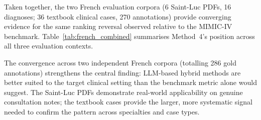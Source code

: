 Taken together, the two French evaluation corpora (6 Saint-Luc PDFs, 16 diagnoses; 36 textbook clinical cases, 270 annotations) provide converging evidence for the same ranking reversal observed relative to the MIMIC-IV benchmark. Table~\ref{tab:french_combined} summarises Method~4's position across all three evaluation contexts.

\begin{table}[htbp]
\centering
\scriptsize
\caption{Method~4 top-5 hit rate across all evaluation contexts.}
\label{tab:french_combined}
\end{table}

The convergence across two independent French corpora (totalling 286 gold annotations) strengthens the central finding: LLM-based hybrid methods are better suited to the target clinical setting than the benchmark metric alone would suggest. The Saint-Luc PDFs demonstrate real-world applicability on genuine consultation notes; the textbook cases provide the larger, more systematic signal needed to confirm the pattern across specialties and case types.

